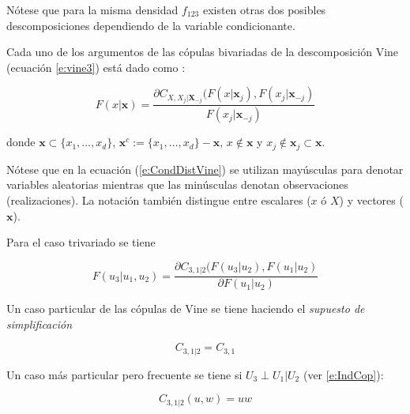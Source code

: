 N\'{o}tese que para la misma densidad $f_{123}$ existen otras dos posibles descomposiciones dependiendo de la variable condicionante.

Cada uno de los argumentos de las c\'opulas bivariadas de la descomposici\'on Vine (ecuaci\'on \ref{e:vine3}) est\'a dado como \citep{mai_simulating_2012,aas_pair-copula_2009,dismann_statistical_2010}:

\begin{equation}
F(x| \mathbf{x}) = \frac{\partial C_{X,X_j|\mathbf{X}_{-j}}
(F(x|\mathbf{x}_j), F(x_j|\mathbf{x}_{-j})}
{F(x_j|\mathbf{x}_{-j})}
\label{e:CondDistVine}
\end{equation}

\noindent
donde $\mathbf{x} \subset \{x_1, \ldots, x_d \}$, $\mathbf{x}^c:= \{x_1,\ldots, x_d\} - \mathbf{x}$, $x \notin \mathbf{x}$  y $x_j \notin \mathbf{x}_j \subset \mathbf{x}$.

N\'{o}tese que en la ecuaci\'{o}n (\ref{e:CondDistVine}) se utilizan may\'{u}sculas para denotar variables aleatorias mientras que las min\'{u}sculas denotan observaciones (realizaciones). La notaci\'{o}n tambi\'en distingue entre escalares ($x$ \'{o} $X$) y vectores ($\mathbf{x}$).

Para el caso trivariado se tiene \citep[pp. 209, example 5.7]{mai_simulating_2012} 

\begin{equation}
F(u_3| u_1,u_2) = \frac{\partial C_{3,1|2}
(F(u_3|u_2), F(u_1|u_2)}
{\partial F(u_1|u_2)}
\label{e:CondDistVine3}
\end{equation}

Un caso particular de las c\'opulas de Vine se tiene haciendo el \textit{supuesto de simplificaci\'on} \citep{joe_dependence_2014,gijbels_conditional_2011}

\begin{equation}
C_{3,1|2} = C_{3,1}
\label{e:simpAssum} %
\end{equation}

Un caso m\'as particular pero frecuente se tiene si $U_3 \perp U_1 | U_2$ (ver \ref{e:IndCop}):

\begin{equation}
C_{3,1|2} (u,w) = uw
\label{e:CondInd} %
\end{equation}

